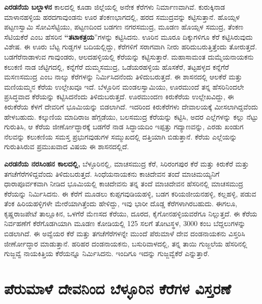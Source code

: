 \newpage

\textbf{ಎರಡನೆಯ ಬಲ್ಲಾಳನ} ಕಾಲದಲ್ಲಿ ಕೂಡಾ ಜಿಲ್ಲೆಯಲ್ಲಿ ಅನೇಕ ಕೆರೆಗಳು ನಿರ್ಮಾಣವಾಗಿವೆ. ಕುರುಕ್ಕಿನಾಡ ಮಾಳಾನಹಳ್ಳಿಯ ಹರದಗಾವುಂಡನು ಊರ ತೆಂಕಣಭಾಗದಲ್ಲಿ, ಹರದ ಸಮುದ್ರವನ್ನು ಕಟ್ಟಿಸುತ್ತಾನೆ. ಹೊಯ್ಸಳ ಪಟ್ಟಣಸ್ವಾಮಿ ಸೋವಿಸೆಟ್ಟಿಯು, ಪಟ್ಟಣದಿಂದ ಬಡಗಣ ನಗರಸಮುದ್ರ, ಮೂಡಣ ಹೊಯ್ಸಳ ಸಮುದ್ರ, ತೆಂಕಣ ಸೆಟಿಯಕೆರೆ ಎಂಬ ಹೆಸರಿನ \textbf{“ತಟಾಕತ್ರಯ}”ಗಳನ್ನು ಕಟ್ಟಿಸಿದನು. ಊರಿನ ಮೂರೂ ದಿಕ್ಕುಗಳಿಗೂ ಕೆರೆ ಕಟ್ಟಿಸಿರುವುದು ವಿಶೇಷ. ಈ ಊರು ಬೆಟ್ಟ ಗುಡ್ಡಗಳ ಬದಿಯಲ್ಲಿದ್ದು, ಕೆರೆಗಳಿಗೆ ಸರಾಗವಾಗಿ ನೀರು ಹರಿದುಬರುತ್ತಿತ್ತೆಂದು ತೋರುತ್ತದೆ. ಬಡಗೆರೆನಾಡಾಳುವ ಗಾವುಂಡರು, ಆಲದಹಳ್ಳಿಯಲ್ಲಿ ಕೆರೆಯನ್ನು ಕಟ್ಟಿಸುತ್ತಾರೆ. ಮಹಾಸಾಮಂತ ದುಮ್ಮೆಯನಾಯಕನು ಕಲುಕಣಿ ನಾಡ ಜೆಟ್ಟಿಗದಲ್ಲಿ, ಕನ್ನೆಗೆರೆ ದುಮ್ಮಸಮುದ್ರ, ಒಡೆಯರಹಳ್ಳಿಯ ಹೊಸಕೆರೆ, ತಟ್ಟಹಳ್ಳದ ಕನ್ನೆಗೆರೆ ಮಸಣಸಮುದ್ರ ಎಂಬ ನಾಲ್ಕು ಕೆರೆಗಳನ್ನು ನಿರ್ಮಿಸಿದನೆಂದು ತಿಳಿದುಬರುತ್ತದೆ. ಈ ಶಾಸನದಲ್ಲಿ ಆಲಕೆರೆ ಮತ್ತು ಮಣಿಯಮ್ಮನ ಕೆರೆಯ ಉಲ್ಲೇಖವೂ ಇದೆ. ಬೆಳ್ಳೂರಿನ ಮಂಡಲಸ್ವಾಮಿಯು, ಊರಮುಂದೆ ತನ್ನ ಹೆಸರಿನಿಂದಲೇ ಪ್ರಸಿದ್ಧವಾದ ಕೆರೆಯನ್ನು ಕಟ್ಟಿಸಿದನೆಂದು ತಿಳಿದುಬರುತ್ತದೆ. ಊರಮುಂದಣ ಕಿರುಕೆರೆಯ ಉಲ್ಲೇಖವಿದ್ದು, ಈ ಕಿರುಕೆರೆಯ ಕೆಳಗೆ ದೇವರಿಗೆ ಭೂಮಿಯನ್ನು ಬಿಡಲಾಗಿದೆ. ಇದರಿಂದ ಕಿರುಕೆರೆಗಳು ದೇವಾಲಯಕ್ಕೆ ಮೀಸಲಾಗಿದ್ದವೆಂದು ಹೇಳಬಹುದು. ಕಲ್ಕುಣಿಯ ಮಾದಿರಾಜ ಹೆಗ್ಗಡೆಯು, ಬಲಸಮುದ್ರ ಕೆರೆಯನ್ನು ಕಟ್ಟಿಸಿ, ಅದರ ಎಲ್ಲೆಗಳನ್ನು ಕಲ್ಲು ನೆಟ್ಟು ಗುರುತಿಸಿ, ಆ ಕೆರೆಯ ಜೀರ್ಣೋದ್ಧಾರಕ್ಕೆ ಬಡಗೆರೆ ನಾಡ ಸಿದ್ಧಾಯದಿಂ ಇಪ್ಪತ್ತು ಗದ್ಯಾಣವನ್ನು, ಎರಡು ಖಂಡುಗ ನೆಲವನ್ನು ಕಲುಕಣಿಯ ಸಮಸ್ತ ಪ್ರಭುಗವುಡುಗಳ ಸಮ್ಮುಖದಲ್ಲಿ ದತ್ತಿಯಾಗಿ ಬಿಡುತ್ತಾನೆ. ಕೆರೆಯ ಎಲ್ಲೆಯನ್ನು ಗುರುತಿಸಿರುವ ಪ್ರಮುಖವಾದ ವಿಷಯ ಈ ಶಾಸನದಲ್ಲಿದೆ.

\textbf{ಎರಡನೆಯ ನರಸಿಂಹನ ಕಾಲದಲ್ಲಿ,} ಬೆಳ್ಳೂರಿನಲ್ಲಿ, ಮಾಚಸಮುದ್ರ ಕೆರೆ, ಸಿರಿರಂಗಪುರ ಕೆರೆ ಮತ್ತು ಕಿರುಕೆರೆ ಮತ್ತು ತಗಚೆಗೆರೆಗಳಿದ್ದವೆಂದು ತಿಳಿದುಬರುತ್ತದೆ. ಸಿಂಧೆಯನಾಯಕನು ಕಾಚಿದೇವನ ತಂದೆ ಮಾಚಿಮಯ್ಯನಿಗೆ ಧಾರಾಪೂರ್ವಕವಾಗಿ ನೀಡಿದ ಭೂಮಿಯಲ್ಲಿ ಕಾಚಿದೇವನು ತನ್ನ ತಂದೆ ಮಾಚಿದೇವನ ಹೆಸರಿನಲ್ಲಿ ಮಾಚಸಮುದ್ರ ಕೆರೆಯನ್ನು ನಿರ್ಮಿಸಿದನು. ಈ ಕೆರೆಗೆ ಮೂಡಲು ಕುಪ್ಪಗವುಡಿಯಹಳ್ಳಿ, ಬಡಗ ಕರಿಯಜೀಯನಹಳ್ಳಿ, ಕಲ್ಲಹಳ್ಳಿ, ಪಡುವ ತೆಂಕ ಹಿರಿಯಹಳ್ಳಿಗಳೇ ಮೇರೆಯಾಗಿತ್ತೆಂದು ಹೇಳಿದ್ದು, ಇವು ಭಾರೀ ದೊಡ್ಡ ಕೆರೆಗಳಾಗಿರಬಹುದು. ಈಗಲೂ, ಕೃಷ್ಣರಾಜಪೇಟೆ ತಾಲ್ಲೂಕಿನ, ಒಳಗೆರೆ ಮೆಣಸದ ಕೆರೆಯು, ದೂರದ, ಕೈಗೋನಹಳ್ಳಿಯವರೆಗೂ ನಿಲ್ಲುತ್ತದೆ. ಈ ಕೆರೆಯ ನಿರ್ವಹಣೆಗೆ ಕೆರೆಗೊಡಗಿಯಾಗಿ ಮೂಡಣ ಕೋಡಿಯಲ್ಲಿ 125 ಸಲಗೆ ತೋಟಸ್ಥಳ, 3000 ಕಂಬ ಬೆದ್ದಲುಗಳನ್ನು ಬಿಡಲಾಗಿದೆ. ಈ ಅವ್ವೆಯರ ಕೆರೆ ಮತ್ತು ತಗಚೆಗೆರೆಗಳನ್ನೇ ಮುಂದೆ ಪೆರುಮಾಳೆ ದೇವ ದಂಡನಾಯಕನು ವಿಸ್ತರಿಸಿ ಜೀರ್ಣೋದ್ಧಾರ ಮಾಡುತ್ತಾನೆ. ಹರಿಹರ ದಂಡನಾಯಕನು, ಬಸುರಿವಾಳದಲ್ಲಿ, ತನ್ನ ತಾಯಿ ಗುಜ್ಜಲೆಯ ಹೆಸರಿನಲ್ಲಿ ಗುಜ್ಜವ್ವೆ ನಾಯಕಿತ್ತಿಯ ಕೆರೆಯನ್ನೂ ನಿರ್ಮಿಸಿದನು. ಇಂದಿಗೂ ಇದನ್ನು ಗುಜ್ಜವ್ವೆಕೆರೆ ಎನ್ನುತ್ತಾರೆ.


\section{ಪೆರುಮಾಳೆ ದೇವನಿಂದ ಬೆಳ್ಳೂರಿನ ಕೆರೆಗಳ ವಿಸ್ತರಣೆ}

